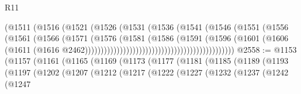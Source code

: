 \begin{lexlean}{R11}
\begin{coremodule}
{{{{{{{{{{{{{{{{{{{{{{{{{{{{{{{{{{{{{{{{{{{{{{{{{{{{{{{{{{{{{{{{{{{{{{{{{{{{{{{{{{{{{{{{{{{{{{{{{{{{{{{{{{                                                      (@1511
                                                        (@1516
                                                          (@1521
                                                            (@1526
                                                              (@1531
                                                                (@1536
                                                                  (@1541
                                                                    (@1546
                                                                      (@1551
                                                                        (@1556
                                                                          (@1561
                                                                            (@1566
                                                                              (@1571
                                                                                (@1576
                                                                                  (@1581
                                                                                    (@1586
                                                                                      (@1591
                                                                                        (@1596
                                                                                          (@1601
                                                                                            (@1606
                                                                                              (@1611
                                                                                                (@1616
                                                                                                  @2462)))))))))))))))))))))))))))))))))))))))))))))))
@2558 := @1153
    (@1157
      (@1161
        (@1165
          (@1169
            (@1173
              (@1177
                (@1181
                  (@1185
                    (@1189
                      (@1193
                        (@1197
                          (@1202
                            (@1207
                              (@1212
                                (@1217
                                  (@1222
                                    (@1227
                                      (@1232
                                        (@1237
                                          (@1242
                                            (@1247
}}}}}}}}}}}}}}}}}}}}}}}}}}}}}}}}}}}}}}}}}}}}}}}}}}}}}}}}}}}}}}}}}}}}}}}}}}}}}}}}}}}}}}}}}}}}}}}}}}}}}}}}}}
\end{coremodule}
\end{lexlean}

